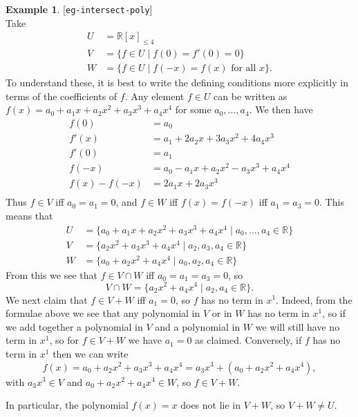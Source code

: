 \documentclass{amsart}
\newcommand{\lbl}[1]{\label{#1}\textup{[\texttt{#1}]}\ \\}
\newcommand{\lbl}{\label}
\newcommand{\R}         {{\mathbb{R}}}
\newcommand{\st}        {\;|\;}
\renewcommand{\:}       {\colon}
\theoremstyle{definition}
\newtheorem{example}[theorem]{Example}
\begin{document}
\begin{example}\lbl{eg-intersect-poly}
 Take  
 \begin{align*}
  U &= \R[x]_{\leq 4} \\
  V &= \{ f\in U\st f(0) = f'(0) = 0 \} \\
  W &= \{ f\in U \st f(-x) = f(x) \text{ for all } x\}.
 \end{align*}
 To understand these, it is best to write the defining conditions more
 explicitly in terms of the coefficients of $f$.  Any element $f\in U$
 can be written as $f(x)=a_0+a_1x+a_2x^2+a_3x^3+a_4x^4$ for some
 $a_0,\dotsc,a_4$.  We then have
 \begin{align*}
  f(0) &= a_0 \\
  f'(x) &= a_1 + 2a_2x + 3a_3x^2 + 4a_4x^3 \\
  f'(0) &= a_1 \\
  f(-x) &= a_0-a_1x+a_2x^2-a_3x^3+a_4x^4 \\
  f(x)-f(-x) &= 2a_1x + 2a_3x^3 \\
 \end{align*}
 Thus $f\in V$ iff $a_0=a_1=0$, and $f\in W$ iff $f(x)=f(-x)$ iff
 $a_1=a_3=0$.  This means that 
 \begin{align*}
  U &= \{ a_0 + a_1x + a_2x^2 + a_3x^3 + a_4x^4 \st
          a_0,\dotsc,a_4\in\R \} \\
  V &= \{ a_2x^2 + a_3x^3 + a_4x^4 \st
          a_2,a_3,a_4\in\R \} \\
  W &= \{ a_0 + a_2x^2 + a_4x^4 \st
          a_0,a_2,a_4\in\R \}
 \end{align*}
 From this we see that $f\in V\cap W$ iff $a_0=a_1=a_3=0$, so
 \[ V\cap W = \{ a_2x^2 + a_4x^4 \st a_2,a_4\in\R\}. \]
 We next claim that $f\in V+W$ iff $a_1=0$, so $f$ has no term in
 $x^1$.  Indeed, from the formulae above we see that any polynomial in
 $V$ or in $W$ has no term in $x^1$, so if we add together a
 polynomial in $V$ and a polynomial in $W$ we will still have no term
 in $x^1$, so for $f\in V+W$ we have $a_1=0$ as claimed.  Conversely,
 if $f$ has no term in $x^1$ then we can write
 \[ f(x) = a_0+a_2x^2+a_3x^3+a_4x^4 = a_3x^3 + (a_0+a_2x^2+a_4x^4), \] 
 with $a_3x^3\in V$ and $a_0+a_2x^2+a_4x^4\in W$, so $f\in V+W$.

 In particular, the polynomial $f(x)=x$ does not lie in
 $V+W$, so $V+W\neq U$.
\end{example}
\end{document}
